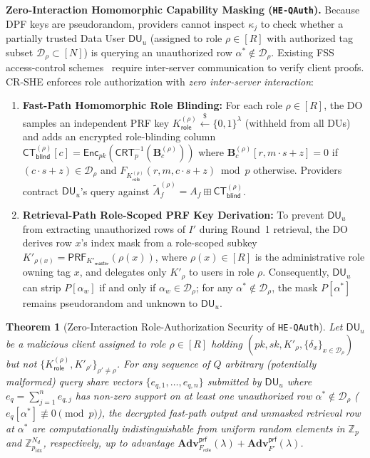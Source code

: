 \documentclass[11pt,a4paper]{article}
\newtheorem{theorem}{Theorem}
\begin{document}
\textbf{Zero-Interaction Homomorphic Capability Masking (\texttt{HE-QAuth}).} Because DPF keys are pseudorandom, providers cannot inspect $\kappa_j$ to check whether a partially trusted Data User $\mathsf{DU}_u$ (assigned to role $\rho \in [R]$ with authorized tag subset $\mathcal{D}_\rho \subset [N]$) is querying an unauthorized row $\alpha^* \notin \mathcal{D}_\rho$. Existing FSS access-control schemes~\cite{servan2023,decastro2022} require inter-server communication to verify client proofs. CR-SHE enforces role authorization with \textit{zero inter-server interaction}:
\begin{enumerate}\setlength{\itemsep}{2pt}\setlength{\parskip}{0pt}
    \item \textbf{Fast-Path Homomorphic Role Blinding:} For each role $\rho \in [R]$, the DO samples an independent PRF key $K_{\mathsf{role}}^{(\rho)} \xleftarrow{\$} \{0,1\}^\lambda$ (withheld from all DUs) and adds an encrypted role-blinding column $\mathsf{CT}_{\mathsf{blind}}^{(\rho)}[c] = \mathsf{Enc}_{pk}(\mathsf{CRT}_p^{-1}(\mathbf{B}_c^{(\rho)}))$ where $\mathbf{B}_c^{(\rho)}[r, m\cdot s + z] = 0$ if $(c\cdot s + z) \in \mathcal{D}_\rho$ and $F_{K_{\mathsf{role}}^{(\rho)}}(r, m, c\cdot s + z) \bmod p$ otherwise. Providers contract $\mathsf{DU}_u$'s query against $\widetilde{A}_f^{(\rho)} = A_f \boxplus \mathsf{CT}_{\mathsf{blind}}^{(\rho)}$.
    \item \textbf{Retrieval-Path Role-Scoped PRF Key Derivation:} To prevent $\mathsf{DU}_u$ from extracting unauthorized rows of $I'$ during Round~1 retrieval, the DO derives row $x$'s index mask from a role-scoped subkey $K'_{\rho(x)} = \mathsf{PRF}_{K'_{\mathsf{master}}}(\rho(x))$, where $\rho(x) \in [R]$ is the administrative role owning tag $x$, and delegates only $K'_\rho$ to users in role $\rho$. Consequently, $\mathsf{DU}_u$ can strip $P[\alpha_w]$ if and only if $\alpha_w \in \mathcal{D}_\rho$; for any $\alpha^* \notin \mathcal{D}_\rho$, the mask $P[\alpha^*]$ remains pseudorandom and unknown to $\mathsf{DU}_u$.
\end{enumerate}

\begin{theorem}[Zero-Interaction Role-Authorization Security of \texttt{HE-QAuth}]\label{thm:he_qauth}
Let $\mathsf{DU}_u$ be a malicious client assigned to role $\rho \in [R]$ holding $(pk, sk, K'_\rho, \{\delta_x\}_{x \in \mathcal{D}_\rho})$ but not $\{K_{\mathsf{role}}^{(\rho)}, K'_{\rho'}\}_{\rho' \neq \rho}$. For any sequence of $Q$ arbitrary (potentially malformed) query share vectors $\{e_{q,1}, \dots, e_{q,n}\}$ submitted by $\mathsf{DU}_u$ where $e_q = \sum_{j=1}^n e_{q,j}$ has non-zero support on at least one unauthorized row $\alpha^* \notin \mathcal{D}_\rho$ ($e_q[\alpha^*] \not\equiv 0 \pmod p$), the decrypted fast-path output and unmasked retrieval row at $\alpha^*$ are computationally indistinguishable from uniform random elements in $\mathbb{Z}_p$ and $\mathbb{Z}_{p_{\mathrm{idx}}}^{N_d}$, respectively, up to advantage $\mathbf{Adv}^{\mathsf{prf}}_{F_{\mathsf{role}}}(\lambda) + \mathbf{Adv}^{\mathsf{prf}}_{F'}(\lambda)$.
\end{theorem}
\end{document}
